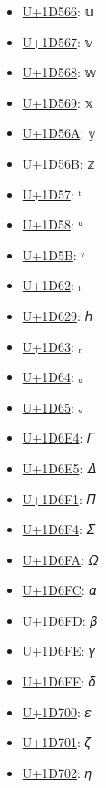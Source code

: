 \begin{itemize}
	\item \href{https://decodeunicode.org/en/u+1D566}{U+1D566}: 𝕦
	\item \href{https://decodeunicode.org/en/u+1D567}{U+1D567}: 𝕧
	\item \href{https://decodeunicode.org/en/u+1D568}{U+1D568}: 𝕨
	\item \href{https://decodeunicode.org/en/u+1D569}{U+1D569}: 𝕩
	\item \href{https://decodeunicode.org/en/u+1D56A}{U+1D56A}: 𝕪
	\item \href{https://decodeunicode.org/en/u+1D56B}{U+1D56B}: 𝕫
	\item \href{https://decodeunicode.org/en/u+1D57}{U+1D57}: ᵗ
	\item \href{https://decodeunicode.org/en/u+1D58}{U+1D58}: ᵘ
	\item \href{https://decodeunicode.org/en/u+1D5B}{U+1D5B}: ᵛ
	\item \href{https://decodeunicode.org/en/u+1D62}{U+1D62}: ᵢ
	\item \href{https://decodeunicode.org/en/u+1D629}{U+1D629}: 𝘩
	\item \href{https://decodeunicode.org/en/u+1D63}{U+1D63}: ᵣ
	\item \href{https://decodeunicode.org/en/u+1D64}{U+1D64}: ᵤ
	\item \href{https://decodeunicode.org/en/u+1D65}{U+1D65}: ᵥ
	\item \href{https://decodeunicode.org/en/u+1D6E4}{U+1D6E4}: 𝛤
	\item \href{https://decodeunicode.org/en/u+1D6E5}{U+1D6E5}: 𝛥
	\item \href{https://decodeunicode.org/en/u+1D6F1}{U+1D6F1}: 𝛱
	\item \href{https://decodeunicode.org/en/u+1D6F4}{U+1D6F4}: 𝛴
	\item \href{https://decodeunicode.org/en/u+1D6FA}{U+1D6FA}: 𝛺
	\item \href{https://decodeunicode.org/en/u+1D6FC}{U+1D6FC}: 𝛼
	\item \href{https://decodeunicode.org/en/u+1D6FD}{U+1D6FD}: 𝛽
	\item \href{https://decodeunicode.org/en/u+1D6FE}{U+1D6FE}: 𝛾
	\item \href{https://decodeunicode.org/en/u+1D6FF}{U+1D6FF}: 𝛿
	\item \href{https://decodeunicode.org/en/u+1D700}{U+1D700}: 𝜀
	\item \href{https://decodeunicode.org/en/u+1D701}{U+1D701}: 𝜁
	\item \href{https://decodeunicode.org/en/u+1D702}{U+1D702}: 𝜂

\end{itemize}
